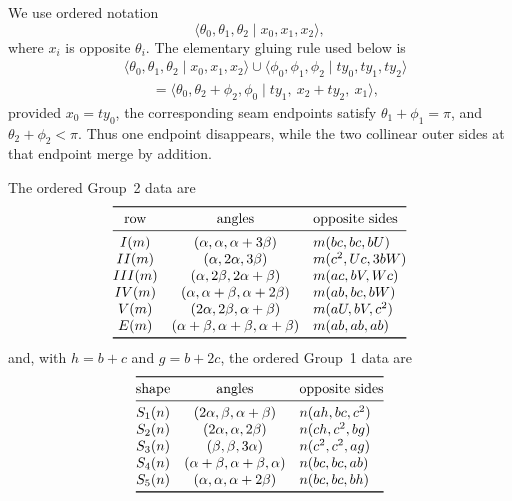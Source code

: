 \documentclass[11pt]{amsart}
\theoremstyle{definition}
\theoremstyle{remark}
\begin{document}
We use ordered notation
\[
 \langle\theta_0,\theta_1,\theta_2\mid x_0,x_1,x_2\rangle,
\]
where $x_i$ is opposite $\theta_i$.  The elementary gluing rule used below is
\[
\begin{aligned}
&\langle\theta_0,\theta_1,\theta_2\mid x_0,x_1,x_2\rangle
 \mathbin{\cup}
 \langle\phi_0,\phi_1,\phi_2\mid ty_0,ty_1,ty_2\rangle\\
&\qquad =
 \langle\theta_0,\theta_2+\phi_2,\phi_0
 \mid ty_1,\ x_2+ty_2,\ x_1\rangle,
\end{aligned}
\]
provided $x_0=ty_0$, the corresponding seam endpoints satisfy
$\theta_1+\phi_1=\pi$, and $\theta_2+\phi_2<\pi$.  Thus one endpoint
disappears, while the two collinear outer sides at that endpoint merge by
addition.

The ordered Group~2 data are
\[
\begin{array}{@{}ccl@{}}
\toprule
\text{row}&\text{angles}&\text{opposite sides}\\
\midrule
I(m)&(\alpha,\alpha,\alpha+3\beta)&m(bc,bc,bU)\\
II(m)&(\alpha,2\alpha,3\beta)&m(c^2,Uc,3bW)\\
III(m)&(\alpha,2\beta,2\alpha+\beta)&m(ac,bV,Wc)\\
IV(m)&(\alpha,\alpha+\beta,\alpha+2\beta)&m(ab,bc,bW)\\
V(m)&(2\alpha,2\beta,\alpha+\beta)&m(aU,bV,c^2)\\
E(m)&(\alpha+\beta,\alpha+\beta,\alpha+\beta)&m(ab,ab,ab)\\
\bottomrule
\end{array}
\]
and, with $h=b+c$ and $g=b+2c$, the ordered Group~1 data are
\[
\begin{array}{@{}ccl@{}}
\toprule
\text{shape}&\text{angles}&\text{opposite sides}\\
\midrule
S_1(n)&(2\alpha,\beta,\alpha+\beta)&n(ah,bc,c^2)\\
S_2(n)&(2\alpha,\alpha,2\beta)&n(ch,c^2,bg)\\
S_3(n)&(\beta,\beta,3\alpha)&n(c^2,c^2,ag)\\
S_4(n)&(\alpha+\beta,\alpha+\beta,\alpha)&n(bc,bc,ab)\\
S_5(n)&(\alpha,\alpha,\alpha+2\beta)&n(bc,bc,bh)\\
\bottomrule
\end{array}
\]
\end{document}
